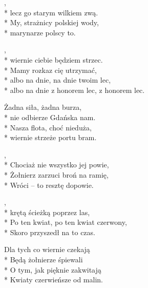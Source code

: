 \begin{lyrics}[longestline={albo na dnie z honorem lec, z honorem lec.}]

,\\*
lecz go starym wilkiem zwą.\\*
My, strażnicy polskiej wody,\\*
marynarze polscy to.

\begin{chorus}
,\\*
wiernie ciebie będziem strzec.\\*
Mamy rozkaz cię utrzymać,\\*
albo na dnie, na dnie twoim lec,\\*
albo na dnie z honorem lec, z honorem lec.
\end{chorus}

Żadna siła, żadna burza,\\*
nie odbierze Gdańska nam.\\*
Nasza flota, choć nieduża,\\*
wiernie strzeże portu bram.

\chorusref
\end{lyrics}




\begin{lyrics}[longestline={Po ten kwiat, po ten kwiat czerwony,}]

,\\*
Chociaż nie wszystko jej powie,\\*
Żołnierz zarzuci broń na ramię,\\*
Wróci -- to resztę dopowie.

\begin{chorus}[mark=false]
,\\*
krętą ścieżką poprzez las,\\*
Po ten kwiat, po ten kwiat czerwony,\\*
Skoro przyszedł na to czas.
\end{chorus}

\chorusref

Dla tych co wiernie czekają\\*
Będą żołnierze śpiewali\\*
O tym, jak pięknie zakwitają\\*
Kwiaty czerwieńsze od malin.

\chorusref
\end{lyrics}



